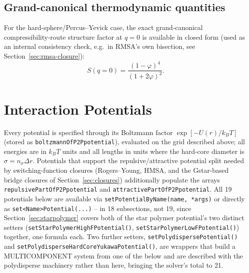 \documentclass[11pt,a4paper]{article}
\newcommand{\code}[1]{\texttt{#1}}
\begin{document}
\subsection{Grand-canonical thermodynamic quantities}

For the hard-sphere/Percus--Yevick case, the exact grand-canonical
compressibility-route structure factor at $q=0$ is available in closed form
(used as an internal consistency check, e.g.\ in RMSA's own bisection, see
Section~\ref{sec:rmsa-closure}):
\begin{equation}
  S(q\!=\!0) = \frac{(1-\varphi)^4}{(1+2\varphi)^2}.
\end{equation}

\section{Interaction Potentials}
\label{sec:potentials}

Every potential is specified through its Boltzmann factor
$\exp[-U(r)/k_BT]$ (stored as \code{boltzmannOfP2Ppotential}), evaluated on the
grid described above; all energies are in $k_BT$ units and all lengths in units
where the hard-core diameter is $\sigma=n_\sigma\Delta r$. Potentials that
support the repulsive/attractive potential split needed by
switching-function closures (Rogers--Young, HMSA, and the Gstar-based bridge
closures of Section~\ref{sec:closures}) additionally populate the arrays
\code{repulsivePartOfP2Ppotential} and \code{attractivePartOfP2Ppotential}.
All 19
potentials below are available via \code{setPotentialByName(name, *args)} or
directly as \code{set<Name>Potential(...)} -- in 18 subsections, not 19,
since Section~\ref{sec:starpolymer} covers both of the star polymer
potential's two distinct setters (\code{setStarPolymerHighFPotential()},
\code{setStarPolymerLowFPotential()}) together, one formula each.
Two further setters, \code{setPolydispersePotential()} and
\code{setPolydisperseHardCoreYukawaPotential()}, are wrappers that build a
MULTICOMPONENT system from one of the below and are described with the
polydisperse machinery rather than here, bringing the solver's total to 21.
\end{document}

